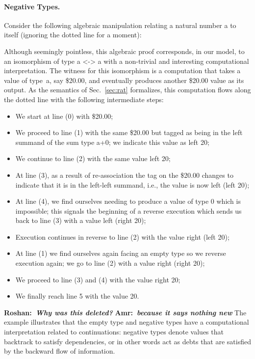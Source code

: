 \documentclass[preprint]{sigplanconf}
\newcommand{\xcomment}[2]{\textbf{#1:~\textsl{#2}}}
\newcommand{\amr}[1]{\xcomment{Amr}{#1}}
\newcommand{\roshan}[1]{\xcomment{Roshan}{#1}}
\begin{document}
\paragraph*{Negative Types.} 
Consider the following algebraic manipulation relating a natural number {{a}}
to itself (ignoring the dotted line for a moment):
\begin{center}
\end{center}
Although seemingly pointless, this algebraic proof corresponds, in our model,
to an isomorphism of type {{a <-> a}} with a non-trivial and interesting
computational interpretation. The witness for this isomorphism is a
computation that takes a value of type~{{a}}, say \$20.00, and eventually
produces another \$20.00 value as its output. As the semantics of
Sec.~\ref{sec:rat} formalizes, this computation flows along the dotted line
with the following intermediate steps:
\begin{itemize}
\item We start at line (0) with \$20.00; 
\item We proceed to line (1) with the same \$20.00 but tagged as being
  in the left summand of the sum type {{a+0}}; we indicate this value
  as {{left 20}};
\item We continue to line (2) with the same value {{left 20}};
\item At line (3), as a result of re-association the tag on the \$20.00
  changes to indicate that it is in the left-left summand, i.e., the value is
  now {{left (left 20)}};
\item At line (4), we find ourselves needing to produce a value of type 0
  which is impossible; this signals the beginning of a reverse execution
  which sends us back to line (3) with a value {{left (right 20)}};
\item Execution continues in reverse to line (2) with the value 
  {{right (left 20)}};
\item At line (1) we find ourselves again facing an empty type so we reverse
  execution again; we go to line (2) with a value {{right (right 20)}};
\item We proceed to line (3) and (4) with the value {{right 20}};
\item We finally reach line 5 with the value {{20}}.
\end{itemize}
\roshan{Why was this deleted?}
\amr{because it says nothing new}
The example illustrates that the empty type and negative types have a
computational interpretation related to continuations: negative types denote
values that backtrack to satisfy dependencies, or in other words act as debts
that are satisfied by the backward flow of information.
\end{document}
